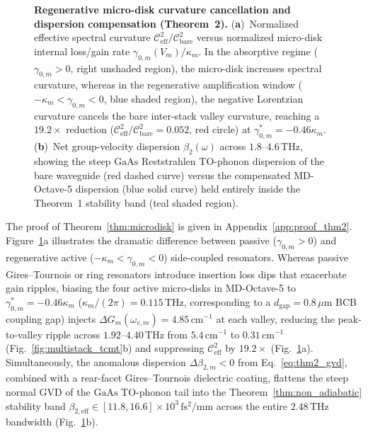 \documentclass[11pt,letterpaper]{article}
\begin{document}
\begin{figure}[t!]
\centering
\resizebox{0.97\textwidth}{!}{}
\caption{\textbf{Regenerative micro-disk curvature cancellation and dispersion compensation (Theorem~2).} (\textbf{a})~Normalized effective spectral curvature $\mathcal{C}_{\mathrm{eff}}^2 / \mathcal{C}_{\mathrm{bare}}^2$ versus normalized micro-disk internal loss/gain rate $\gamma_{0,m}(V_m)/\kappa_m$. In the absorptive regime ($\gamma_{0,m} > 0$, right unshaded region), the micro-disk increases spectral curvature, whereas in the regenerative amplification window ($-\kappa_m < \gamma_{0,m} < 0$, blue shaded region), the negative Lorentzian curvature cancels the bare inter-stack valley curvature, reaching a $19.2\times$ reduction ($\mathcal{C}_{\mathrm{eff}}^2/\mathcal{C}_{\mathrm{bare}}^2 = 0.052$, red circle) at $\gamma_{0,m}^* = -0.46\kappa_m$. (\textbf{b})~Net group-velocity dispersion $\beta_2(\omega)$ across $1.8\text{--}4.6\,\mathrm{THz}$, showing the steep $\mathrm{GaAs}$ Reststrahlen TO-phonon dispersion of the bare waveguide (red dashed curve) versus the compensated MD-Octave-5 dispersion (blue solid curve) held entirely inside the Theorem~1 stability band (teal shaded region).}
\label{fig:tcmt_gvd}
\end{figure}

The proof of Theorem~\ref{thm:microdisk} is given in Appendix~\ref{app:proof_thm2}. Figure~\ref{fig:tcmt_gvd}a illustrates the dramatic difference between passive ($\gamma_{0,m} > 0$) and regenerative active ($-\kappa_m < \gamma_{0,m} < 0$) side-coupled resonators. Whereas passive Gires--Tournois or ring resonators introduce insertion loss dips that exacerbate gain ripples, biasing the four active micro-disks in MD-Octave-5 to $\gamma_{0,m}^* = -0.46\kappa_m$ ($\kappa_m/(2\pi) = 0.115\,\mathrm{THz}$, corresponding to a $d_{\mathrm{gap}} = 0.8\,\mu\mathrm{m}$ BCB coupling gap) injects $\Delta G_m(\omega_{v,m}) = 4.85\,\mathrm{cm}^{-1}$ at each valley, reducing the peak-to-valley ripple across $1.92\text{--}4.40\,\mathrm{THz}$ from $5.4\,\mathrm{cm}^{-1}$ to $0.31\,\mathrm{cm}^{-1}$ (Fig.~\ref{fig:multistack_tcmt}b) and suppressing $\mathcal{C}_{\mathrm{eff}}^2$ by $19.2\times$ (Fig.~\ref{fig:tcmt_gvd}a). Simultaneously, the anomalous dispersion $\Delta\beta_{2,m} < 0$ from Eq.~\eqref{eq:thm2_gvd}, combined with a rear-facet Gires--Tournois dielectric coating, flattens the steep normal GVD of the $\mathrm{GaAs}$ TO-phonon tail into the Theorem~\ref{thm:non_adiabatic} stability band $\beta_{2,\mathrm{eff}} \in [11.8, 16.6]\times 10^3\,\mathrm{fs^2/mm}$ across the entire $2.48\,\mathrm{THz}$ bandwidth (Fig.~\ref{fig:tcmt_gvd}b).
\end{document}
